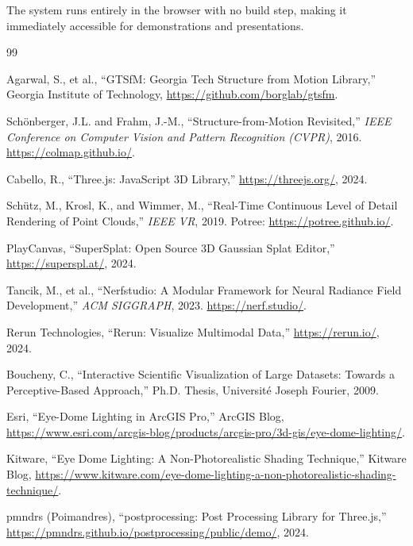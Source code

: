 \documentclass[11pt, letterpaper]{article}
\begin{document}
The system runs entirely in the browser with no build step, making it immediately accessible for demonstrations and presentations.

\begin{thebibliography}{99}

    Agarwal, S., et al.,
    ``GTSfM: Georgia Tech Structure from Motion Library,''
    Georgia Institute of Technology,
    \url{https://github.com/borglab/gtsfm}.

    Sch\"{o}nberger, J.L. and Frahm, J.-M.,
    ``Structure-from-Motion Revisited,''
    \textit{IEEE Conference on Computer Vision and Pattern Recognition (CVPR)}, 2016.
    \url{https://colmap.github.io/}.

    Cabello, R.,
    ``Three.js: JavaScript 3D Library,''
    \url{https://threejs.org/}, 2024.

    Sch\"{u}tz, M., Krosl, K., and Wimmer, M.,
    ``Real-Time Continuous Level of Detail Rendering of Point Clouds,''
    \textit{IEEE VR}, 2019.
    Potree: \url{https://potree.github.io/}.

    PlayCanvas,
    ``SuperSplat: Open Source 3D Gaussian Splat Editor,''
    \url{https://superspl.at/}, 2024.

    Tancik, M., et al.,
    ``Nerfstudio: A Modular Framework for Neural Radiance Field Development,''
    \textit{ACM SIGGRAPH}, 2023.
    \url{https://nerf.studio/}.

    Rerun Technologies,
    ``Rerun: Visualize Multimodal Data,''
    \url{https://rerun.io/}, 2024.

    Boucheny, C.,
    ``Interactive Scientific Visualization of Large Datasets: Towards a Perceptive-Based Approach,''
    Ph.D. Thesis, Universit\'{e} Joseph Fourier, 2009.

    Esri,
    ``Eye-Dome Lighting in ArcGIS Pro,''
    ArcGIS Blog,
    \url{https://www.esri.com/arcgis-blog/products/arcgis-pro/3d-gis/eye-dome-lighting/}.

    Kitware,
    ``Eye Dome Lighting: A Non-Photorealistic Shading Technique,''
    Kitware Blog,
    \url{https://www.kitware.com/eye-dome-lighting-a-non-photorealistic-shading-technique/}.

    pmndrs (Poimandres),
    ``postprocessing: Post Processing Library for Three.js,''
    \url{https://pmndrs.github.io/postprocessing/public/demo/}, 2024.


\end{thebibliography}
\end{document}
